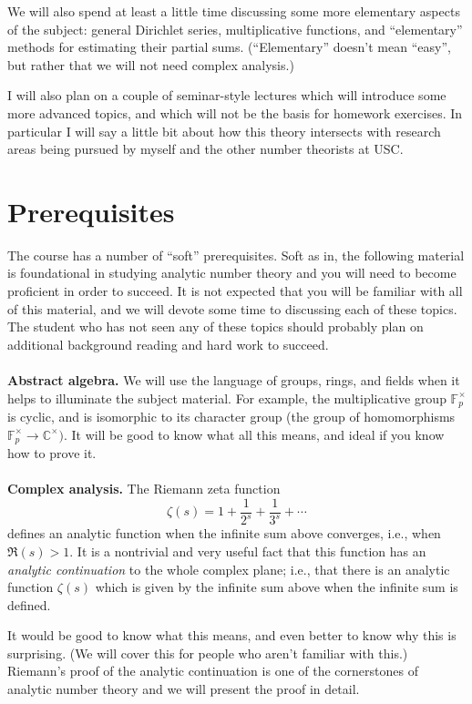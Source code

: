 \documentclass[11pt]{amsart}
\theoremstyle{remark}
\numberwithin{theorem}{section} \numberwithin{equation}{section}
\begin{document}
We will also spend at least a little time discussing some more elementary aspects of the subject:
general Dirichlet series, multiplicative functions, and ``elementary'' methods for estimating their partial sums.
(``Elementary'' doesn't mean ``easy'', but rather that we will not need complex analysis.)

I will also plan on a couple of seminar-style lectures which will introduce some more advanced topics, and which will not be the basis
for homework exercises. In particular I will say a little bit about how this theory
intersects with research areas being pursued by myself and the other number theorists at USC.

\section{Prerequisites}
The course has a number of ``soft'' prerequisites. Soft as in, the following material is foundational in studying analytic number theory
and you will need to become proficient in order to succeed.
It is not expected that you will be familiar with all of this material, and we will devote some time to discussing each of these topics.
The student who has not seen any of these topics should probably plan on additional background reading and hard work to succeed.
\\
\\
{\bf Abstract algebra.} We will use the language of groups, rings, and fields when it helps to illuminate the subject material. For example,
the multiplicative group $\mathbb{F}_p^{\times}$ is cyclic, and is isomorphic to its character group (the group of homomorphisms
$\mathbb{F}_p^{\times} \rightarrow \mathbb{C}^{\times}).$ It will be good to know what all this means, and ideal if you know how to prove it.
\\
\\
{\bf Complex analysis.} The Riemann zeta function 
\begin{equation}
\zeta(s) = 1 + \frac{1}{2^s} + \frac{1}{3^s} + \cdots
\end{equation}
defines an analytic function when the infinite sum above converges, i.e., when $\Re(s) > 1$. It is a nontrivial and very useful fact
that this function has an {\itshape analytic continuation} to the whole complex plane; 
i.e., that there is an analytic function $\zeta(s)$ which is given by the infinite
sum above when the infinite sum is defined.

It would be good to know what this means, and even better to know why this is surprising. (We will cover this for people who aren't familiar
with this.) Riemann's proof of the analytic continuation
is one of the cornerstones of analytic number theory and we will present the proof in detail.
\end{document}
